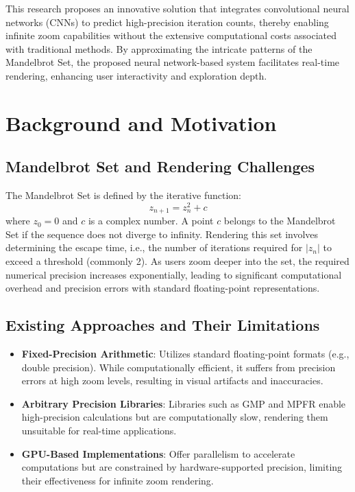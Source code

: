 \documentclass[journal]{IEEEaccess}
\begin{document}
This research proposes an innovative solution that integrates convolutional neural networks (CNNs) to predict high-precision iteration counts, thereby enabling infinite zoom capabilities without the extensive computational costs associated with traditional methods. By approximating the intricate patterns of the Mandelbrot Set, the proposed neural network-based system facilitates real-time rendering, enhancing user interactivity and exploration depth.

\section{Background and Motivation}
\label{sec:background}
\subsection{Mandelbrot Set and Rendering Challenges}
The Mandelbrot Set is defined by the iterative function:
\begin{equation}
    z_{n+1} = z_n^2 + c
\end{equation}
where \( z_0 = 0 \) and \( c \) is a complex number. A point \( c \) belongs to the Mandelbrot Set if the sequence does not diverge to infinity. Rendering this set involves determining the escape time, i.e., the number of iterations required for \(|z_n|\) to exceed a threshold (commonly 2). As users zoom deeper into the set, the required numerical precision increases exponentially, leading to significant computational overhead and precision errors with standard floating-point representations.

\subsection{Existing Approaches and Their Limitations}
\begin{itemize}
    \item \textbf{Fixed-Precision Arithmetic}: Utilizes standard floating-point formats (e.g., double precision). While computationally efficient, it suffers from precision errors at high zoom levels, resulting in visual artifacts and inaccuracies.
    
    \item \textbf{Arbitrary Precision Libraries}: Libraries such as GMP and MPFR enable high-precision calculations but are computationally slow, rendering them unsuitable for real-time applications.
    
    \item \textbf{GPU-Based Implementations}: Offer parallelism to accelerate computations but are constrained by hardware-supported precision, limiting their effectiveness for infinite zoom rendering.
\end{itemize}
\end{document}
